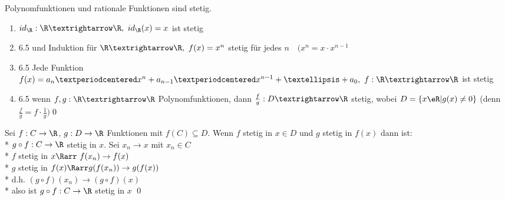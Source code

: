 Polynomfunktionen und rationale Funktionen sind stetig.
\bew
\begin{enumerate}
\item{$id_{\R}:\R→\R,\ id_{\R}(x)=x$ ist stetig}
\item{6.5 und Induktion \Rarr{} für $\R→\R,\ f(x)=x^n$ stetig für jedes $n\quad (x^n=x·x^{n-1}$}
\item{6.5 \Rarr{} Jede Funktion $f(x)=a_n·x^{n}+a_{n-1}·x^{n-1}+…+a_0,\ f:\R→\R$ ist stetig}
\item{6.5 \Rarr{} wenn $f,g:\R→\R$ Polynomfunktionen, dann $\frac{f}{g}:D→\R$ stetig, wobei $D=\{x\eR|g(x)\neq 0\}$ (denn $\frac{f}{g}=f·\frac{1}{g})$\qed}
\end{enumerate}

Sei $f: C \to \R$, $g: D \to \R$ Funktionen mit $f(C) \subseteq D$. Wenn $f$ stetig in $x \in D$ und $g$ stetig in $f(x)$ dann ist:\\*
$g \circ f: C \to \R$ stetig in $x$.
Sei $x_n \to x$ mit $x_n \in C$\\*
$f$ stetig in $x \Rarr \ f(x_n) \to f(x)$\\*
$g$ stetig in $f(x) \Rarr g(f(x_n)) \to g(f(x))$\\*
d.h. $(g \circ f)(x_n) \to (g \circ f)(x)$\\*
also ist $g \circ f: C \to \R$ stetig in $x$ \qed

